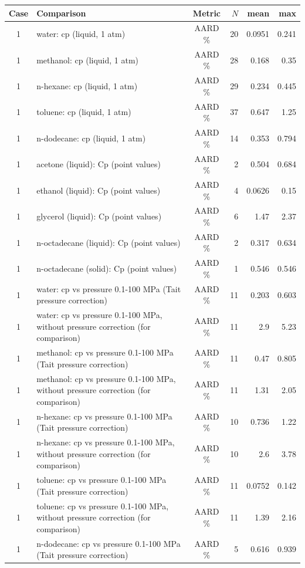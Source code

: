 \begin{tabular}{c p{8.6cm} c r r r}
\toprule
Case & Comparison & Metric & $N$ & mean & max \\
\midrule
1 & water: cp (liquid, 1 atm) & AARD \% & 20 & 0.0951 & 0.241 \\
1 & methanol: cp (liquid, 1 atm) & AARD \% & 28 & 0.168 & 0.35 \\
1 & n-hexane: cp (liquid, 1 atm) & AARD \% & 29 & 0.234 & 0.445 \\
1 & toluene: cp (liquid, 1 atm) & AARD \% & 37 & 0.647 & 1.25 \\
1 & n-dodecane: cp (liquid, 1 atm) & AARD \% & 14 & 0.353 & 0.794 \\
1 & acetone (liquid): Cp (point values) & AARD \% & 2 & 0.504 & 0.684 \\
1 & ethanol (liquid): Cp (point values) & AARD \% & 4 & 0.0626 & 0.15 \\
1 & glycerol (liquid): Cp (point values) & AARD \% & 6 & 1.47 & 2.37 \\
1 & n-octadecane (liquid): Cp (point values) & AARD \% & 2 & 0.317 & 0.634 \\
1 & n-octadecane (solid): Cp (point values) & AARD \% & 1 & 0.546 & 0.546 \\
1 & water: cp vs pressure 0.1-100 MPa (Tait pressure correction) & AARD \% & 11 & 0.203 & 0.603 \\
1 & water: cp vs pressure 0.1-100 MPa, without pressure correction (for comparison) & AARD \% & 11 & 2.9 & 5.23 \\
1 & methanol: cp vs pressure 0.1-100 MPa (Tait pressure correction) & AARD \% & 11 & 0.47 & 0.805 \\
1 & methanol: cp vs pressure 0.1-100 MPa, without pressure correction (for comparison) & AARD \% & 11 & 1.31 & 2.05 \\
1 & n-hexane: cp vs pressure 0.1-100 MPa (Tait pressure correction) & AARD \% & 10 & 0.736 & 1.22 \\
1 & n-hexane: cp vs pressure 0.1-100 MPa, without pressure correction (for comparison) & AARD \% & 10 & 2.6 & 3.78 \\
1 & toluene: cp vs pressure 0.1-100 MPa (Tait pressure correction) & AARD \% & 11 & 0.0752 & 0.142 \\
1 & toluene: cp vs pressure 0.1-100 MPa, without pressure correction (for comparison) & AARD \% & 11 & 1.39 & 2.16 \\
1 & n-dodecane: cp vs pressure 0.1-100 MPa (Tait pressure correction) & AARD \% & 5 & 0.616 & 0.939 \\

\end{tabular}
